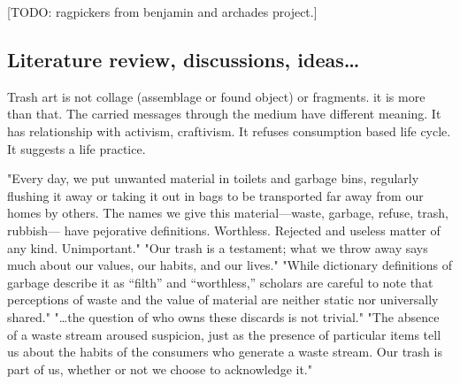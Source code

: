 [TODO: ragpickers from benjamin and archades project.]


\subsection{Literature review, discussions, ideas\ldots}
Trash art is not collage (assemblage or found object) or fragments. it is more than that. The carried messages through the medium have different meaning. It has relationship with activism, craftivism. It refuses consumption based life cycle. It suggests a life practice.

"Every day, we put unwanted material in toilets and garbage bins, regularly flushing it away or taking it out in bags to be transported far away from our homes by others. The names we give this material---waste, garbage, refuse, trash, rubbish--- have pejorative definitions. Worthless. Rejected and useless matter of any kind. Unimportant." "Our trash is a testament; what we throw away says much about our values, our habits, and our lives." "While dictionary definitions of garbage describe it as “filth” and “worthless,” scholars are careful to note that perceptions of waste and the value of material are neither static nor universally shared." "\ldots the question of who owns these discards is not trivial." "The absence of a waste stream aroused suspicion, just as the presence of particular items tell us about the habits of the consumers who generate a waste stream. Our trash is part of us, whether or not we choose to acknowledge it." \cite{zimring2012encyclopedia}



